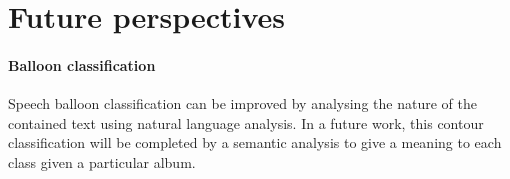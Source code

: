 \section{Future perspectives}
\label{conclusions:perspectives}


\paragraph{Balloon classification} %
\label{par:balloon_classification}
Speech balloon classification can be improved by analysing the nature of the contained text using natural language analysis.
In a future work, this contour classification will be completed by a semantic analysis to give a meaning to each class given a particular album.


